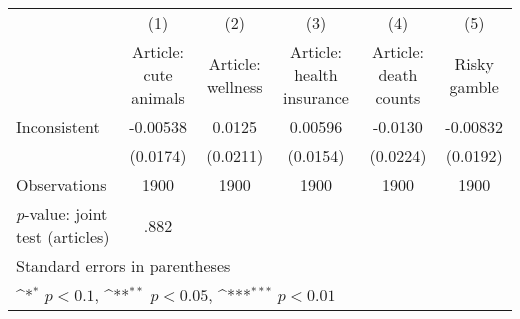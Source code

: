 {
\def\sym#1{\ifmmode^{#1}\else\(^{#1}\)\fi}
\begin{tabular}{l*{5}{c}}
\hline\hline
                    &\multicolumn{1}{c}{(1)}         &\multicolumn{1}{c}{(2)}         &\multicolumn{1}{c}{(3)}         &\multicolumn{1}{c}{(4)}         &\multicolumn{1}{c}{(5)}         \\
                    &Article: cute animals         &Article: wellness         &Article: health insurance         &Article: death counts         &Risky gamble         \\
\hline
Inconsistent        &    -0.00538         &      0.0125         &     0.00596         &     -0.0130         &    -0.00832         \\
                    &    (0.0174)         &    (0.0211)         &    (0.0154)         &    (0.0224)         &    (0.0192)         \\
\hline
Observations        &        1900         &        1900         &        1900         &        1900         &        1900         \\
\textit{p}-value: joint test (articles)&        .882         &                     &                     &                     &                     \\
\hline\hline
\multicolumn{6}{l}{\footnotesize Standard errors in parentheses}\\
\multicolumn{6}{l}{\footnotesize \sym{*} \(p<0.1\), \sym{**} \(p<0.05\), \sym{***} \(p<0.01\)}\\
\end{tabular}
}
